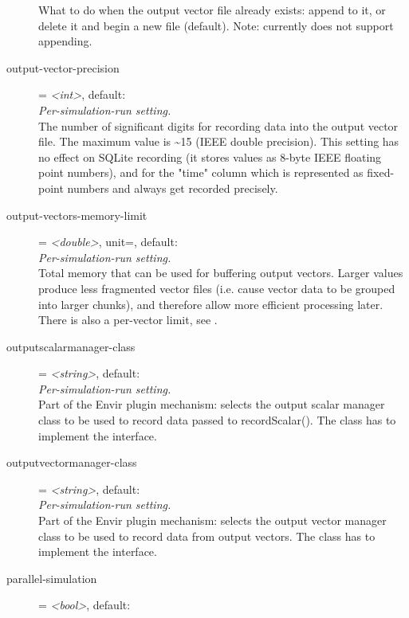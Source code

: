 \begin{description}
    What to do when the output vector file already exists: append to it, or
    delete it and begin a new file (default). Note:
     currently does not support
    appending.
\item[output-vector-precision] = \textit{<int>}, default: \\
    \textit{Per-simulation-run setting.}\\
    The number of significant digits for recording data into the output vector
    file. The maximum value is {\textasciitilde}15 (IEEE double precision).
    This setting has no effect on SQLite recording (it stores values as 8-byte
    IEEE floating point numbers), and for the "time" column which is
    represented as fixed-point numbers and always get recorded precisely.
\item[output-vectors-memory-limit] = \textit{<double>}, unit=, default: \\
    \textit{Per-simulation-run setting.}\\
    Total memory that can be used for buffering output vectors. Larger values
    produce less fragmented vector files (i.e. cause vector data to be grouped
    into larger chunks), and therefore allow more efficient processing later.
    There is also a per-vector limit, see
    .
\item[outputscalarmanager-class] = \textit{<string>}, default: \\
    \textit{Per-simulation-run setting.}\\
    Part of the Envir plugin mechanism: selects the output scalar manager class
    to be used to record data passed to recordScalar(). The class has to
    implement the  interface.
\item[outputvectormanager-class] = \textit{<string>}, default: \\
    \textit{Per-simulation-run setting.}\\
    Part of the Envir plugin mechanism: selects the output vector manager class
    to be used to record data from output vectors. The class has to implement
    the  interface.
\item[parallel-simulation] = \textit{<bool>}, default: \\

\end{description}
